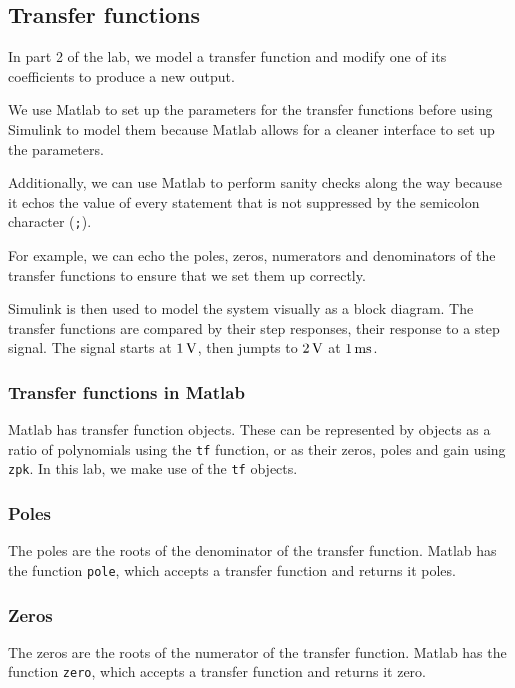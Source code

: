 \documentclass[12pt]{article}
\begin{document}
\subsection{Transfer functions}

In part 2 of the lab, we model a transfer function and modify one of its coefficients to produce a new output.

We use Matlab to set up the parameters for the transfer functions before using Simulink to model them because Matlab allows for a cleaner interface to set up the parameters.

Additionally, we can use Matlab to perform sanity checks along the way because it echos the value of every statement that is not suppressed by the semicolon character (\texttt{;}).

For example, we can echo the poles, zeros, numerators and denominators of the transfer functions to ensure that we set them up correctly.

Simulink is then used to model the system visually as a block diagram.
The transfer functions are compared by their step responses, their response to a step signal.
The signal starts at $\SI1\volt$, then jumpts to $\SI2\volt$ at $\SI1{\milli\second}$.

\subsubsection{Transfer functions in Matlab}

Matlab has transfer function objects.
These can be represented by objects as a ratio of polynomials using the \texttt{tf} function,
or as their zeros, poles and gain using \texttt{zpk}.
In this lab, we make use of the \texttt{tf} objects.

\subsubsection{Poles}

The poles are the roots of the denominator of the transfer function.
Matlab has the function \texttt{pole},
which accepts a transfer function and returns it poles.

\subsubsection{Zeros}

The zeros are the roots of the numerator of the transfer function.
Matlab has the function \texttt{zero},
which accepts a transfer function and returns it zero.
\end{document}
